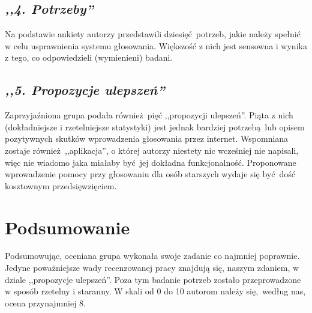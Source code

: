 \documentclass[12pt, a4paper, oneside]{article}
\begin{document}
\subsection*{\textit{,,4. Potrzeby''}}

Na podstawie ankiety autorzy przedstawili dziesięć potrzeb, jakie należy 
spełnić w celu usprawnienia systemu głosowania. Większość z nich jest sensowna 
i wynika z tego, co odpowiedzieli (wymienieni) badani.

\subsection*{\textit{,,5. Propozycje ulepszeń''}}

Zaprzyjaźniona grupa podała również pięć ,,propozycji ulepszeń''. Piąta z nich (dokładniejsze i rzetelniejsze statystyki) jest jednak bardziej potrzebą lub opisem  pozytywnych skutków wprowadzenia głosowania przez internet. Wspomniana 
zostaje również ,,aplikacja'', o której autorzy niestety nic wcześniej nie napisali, więc nie wiadomo jaka miałaby być jej dokładna funkcjonalność. Proponowane wprowadzenie pomocy przy głosowaniu dla osób starszych wydaje się być dość kosztownym przedsięwzięciem.

\section*{Podsumowanie}

Podsumowując, oceniana grupa wykonała swoje zadanie co najmniej poprawnie. 
Jedyne poważniejsze wady recenzowanej pracy znajdują się, naszym zdaniem, w 
dziale ,,propozycje ulepszeń''. Poza tym badanie potrzeb zostało przeprowadzone 
w sposób rzetelny i staranny. W skali od 0 do 10 autorom należy się, według nas,
ocena przynajmniej 8.
\end{document}
